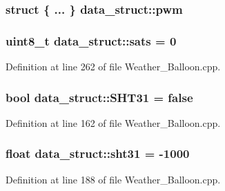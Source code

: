 \subsubsection[{\texorpdfstring{pwm}{pwm}}]{\setlength{\rightskip}{0pt plus 5cm}struct \{ ... \}   data\+\_\+struct\+::pwm}\hypertarget{structdata__struct_a707f8d5848359c1b2e948b24a4a22ba5}{}\label{structdata__struct_a707f8d5848359c1b2e948b24a4a22ba5}
\subsubsection[{\texorpdfstring{sats}{sats}}]{\setlength{\rightskip}{0pt plus 5cm}uint8\+\_\+t data\+\_\+struct\+::sats = 0}\hypertarget{structdata__struct_a62641633667a56580b5cfed6938a8c0c}{}\label{structdata__struct_a62641633667a56580b5cfed6938a8c0c}


Definition at line 262 of file Weather\+\_\+\+Balloon.\+cpp.

\subsubsection[{\texorpdfstring{S\+H\+T31}{SHT31}}]{\setlength{\rightskip}{0pt plus 5cm}bool data\+\_\+struct\+::\+S\+H\+T31 = false}\hypertarget{structdata__struct_aa96945729f4df7683668e5ec1de3f669}{}\label{structdata__struct_aa96945729f4df7683668e5ec1de3f669}


Definition at line 162 of file Weather\+\_\+\+Balloon.\+cpp.

\subsubsection[{\texorpdfstring{sht31}{sht31}}]{\setlength{\rightskip}{0pt plus 5cm}float data\+\_\+struct\+::sht31 = -\/1000}\hypertarget{structdata__struct_a11986539479e2316b0d844a0f6245ab4}{}\label{structdata__struct_a11986539479e2316b0d844a0f6245ab4}


Definition at line 188 of file Weather\+\_\+\+Balloon.\+cpp.

